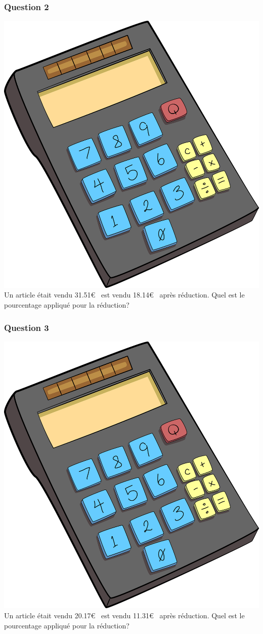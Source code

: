 \documentclass[15pt, mathserif]{beamer}
\begin{document}
\begin{frame} 
	\frametitle{Question 2}
\includegraphics[scale=0.01]{calculatrice}Un article était vendu 31.51\euro ~ est vendu 18.14\euro ~ après réduction. Quel est le pourcentage appliqué pour la réduction? \end{frame}


\begin{frame} 
	\frametitle{Question 3}
\includegraphics[scale=0.01]{calculatrice}Un article était vendu 20.17\euro ~ est vendu 11.31\euro ~ après réduction. Quel est le pourcentage appliqué pour la réduction? \end{frame}
\end{document}
